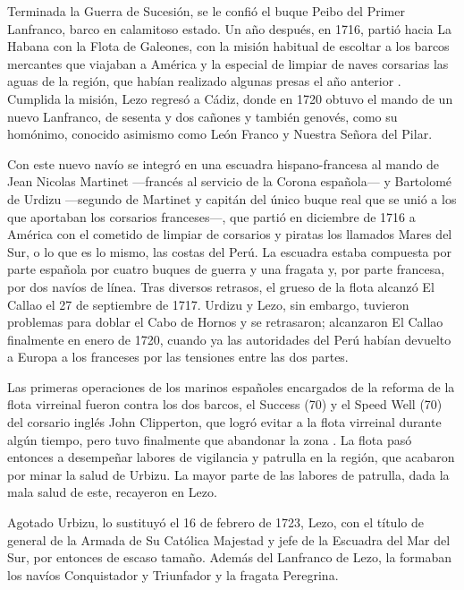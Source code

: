 
Terminada la Guerra de Sucesión, se le confió el buque Peibo del
Primer Lanfranco, barco en calamitoso estado. Un año después, en 1716,
partió hacia La Habana con la Flota de Galeones, con la misión
habitual de escoltar a los barcos mercantes que viajaban a América y
la especial de limpiar de naves corsarias las aguas de la región, que
habían realizado algunas presas el año anterior \cite{qui01}. Cumplida
la misión, Lezo regresó a Cádiz, donde en 1720 obtuvo el mando de un
nuevo Lanfranco, de sesenta y dos cañones y también genovés, como su
homónimo, conocido asimismo como León Franco y Nuestra Señora del
Pilar.

Con este nuevo navío se integró en una escuadra hispano-francesa al
mando de Jean Nicolas Martinet ---francés al servicio de la Corona
española--- y Bartolomé de Urdizu ---segundo de Martinet y capitán del
único buque real que se unió a los que aportaban los corsarios
franceses---, que partió en diciembre de 1716 a América con el cometido
de limpiar de corsarios y piratas los llamados Mares del Sur, o lo que
es lo mismo, las costas del Perú. La escuadra estaba compuesta por
parte española por cuatro buques de guerra y una fragata y, por parte
francesa, por dos navíos de línea. Tras diversos retrasos, el
grueso de la flota alcanzó El Callao el 27 de septiembre de 1717.
Urdizu y Lezo, sin embargo, tuvieron problemas para doblar el Cabo de
Hornos y se retrasaron; alcanzaron El Callao finalmente en enero de
1720, cuando ya las autoridades del Perú habían devuelto a Europa a
los franceses por las tensiones entre las dos partes.

Las primeras operaciones de los marinos españoles encargados de la
reforma de la flota virreinal fueron contra los dos barcos, el Success
(70) y el Speed Well (70) del corsario inglés John Clipperton, que
logró evitar a la flota virreinal durante algún tiempo, pero tuvo
finalmente que abandonar la zona \cite{qui01}. La flota pasó entonces
a desempeñar labores de vigilancia y patrulla en la región, que
acabaron por minar la salud de Urbizu. La mayor parte de las labores
de patrulla, dada la mala salud de este, recayeron en Lezo.

Agotado Urbizu, lo sustituyó el 16 de febrero de 1723, Lezo, con el
título de general de la Armada de Su Católica Majestad y jefe de la
Escuadra del Mar del Sur, por entonces de escaso tamaño. Además
del Lanfranco de Lezo, la formaban los navíos Conquistador y
Triunfador y la fragata Peregrina.


